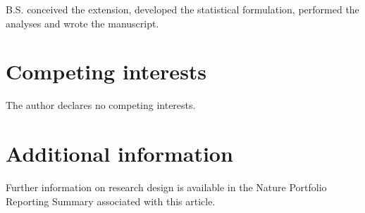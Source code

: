 B.S. conceived the extension, developed the statistical formulation, performed the analyses and wrote the manuscript.

\section*{Competing interests}

The author declares no competing interests.

\section*{Additional information}

Further information on research design is available in the Nature Portfolio Reporting Summary associated with this article.
